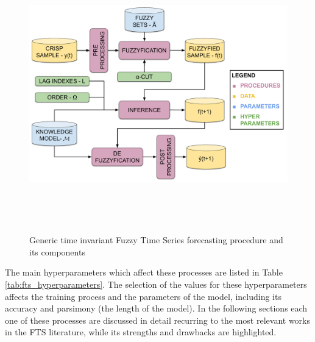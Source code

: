 \begin{figure}[htb]
    \centering
    \includegraphics[width=\textwidth,height=12cm]{figures/fts_forecasting.pdf}
    \caption{Generic time invariant Fuzzy Time Series forecasting procedure and its components}
    \label{fig:fts_forecasting}
\end{figure}


The main hyperparameters which affect these processes are listed in Table \ref{tab:fts_hyperparameters}. The selection of the values for these hyperparameters affects the training process and the parameters of the model, including its accuracy and parsimony (the length of the model).  In the following sections each one of these processes are discussed in detail recurring to the most relevant works in the FTS literature, while its strengths and drawbacks are highlighted.

